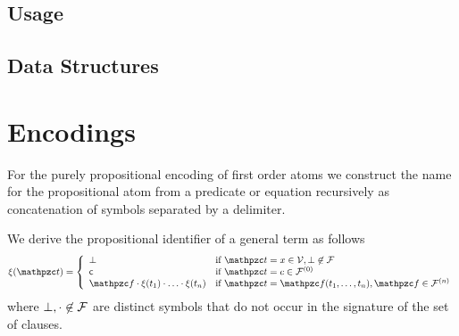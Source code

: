 
\newpage
\subsection{Usage}\label{sec:flea:usage}

\newpage
\subsection{Data Structures}\label{sec:flea:details}


\newpage
\section{Encodings}\label{sec:flea:encodings}


For the purely propositional encoding of first order atoms
we construct the name for the propositional atom
from a predicate or equation recursively as concatenation of symbols
separated by a delimiter.

\begin{definition}
	We derive the propositional identifier of a general term as follows
\begin{gather*}
	\MDEFINE{\xi(\mct)}{ll}{
	\bot &\text{if } \mct=x\in\mcV, \bot\not\in\mcF
	\tag*{}\\
	\mc &\text{if } \mct=c\in\mcFn[0]\\
	\mcf\encsep\xi(t_1)\encsep\ldots\encsep\xi(t_n) &\text{if }\mct=\mcf(t_1,\ldots,t_n), \mcf\in\mcFn
}
\end{gather*}
where \( \bot, \cdot\not\in\mathcal{F} \) are distinct symbols that do not occur in the signature of the set of clauses.
\end{definition}

